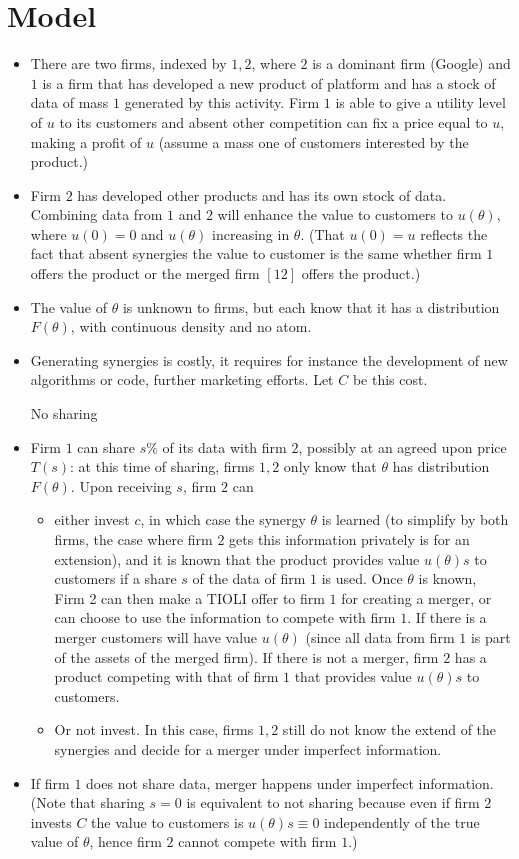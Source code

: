 \documentclass[a4paper,leqno]{article}%
\renewcommand{\t}{\theta}
\begin{document}
\section{Model}
\begin{itemize}
    \item There are two firms, indexed by $1,2$, where $2$ is a dominant firm (Google) and $1$ is a firm that has developed a new product of platform and has a stock of data of mass $1$ generated by this activity. Firm $1$ is able to give a utility level of $u$ to its customers and absent other competition can fix a price equal to $u$, making a profit of $u$ (assume a mass one of customers interested by the product.)
    \item Firm $2$ has developed other products and has its own stock of data. Combining data from $1$ and $2$ will enhance the value to customers to $u(\t)$, where $u(0)=0$ and $u(\t)$ increasing in $\t$. (That $u(0)=u$ reflects the fact that absent synergies the value to customer is the same whether firm $1$ offers the product or the merged firm $[12]$ offers the product.)
    \item The value of $\t$ is unknown to firms, but each know that it has a distribution $F(\t)$, with continuous density and no atom.
    \item Generating synergies is costly, it requires for instance the development of new algorithms or code, further marketing efforts. Let $C$ be this cost.
    \item [No sharing]
    \item Firm $1$ can share $s\%$ of its data with firm $2$, possibly at an agreed upon price $T(s)$: at this time of sharing, firms $1,2$ only know that $\t$ has distribution $F(\t)$. Upon receiving $s$, firm $2$ can 
    \begin{itemize}
        \item either invest $c$, in which case the synergy $\t$ is learned (to simplify by both firms, the case where firm $2$ gets this information privately is for an extension), and it is known that the product provides value $u(\t)s$ to customers if a share $s$ of the data of firm $1$ is used. Once $\t$ is known, Firm 2 can then make a TIOLI offer to firm $1$ for creating a merger, or can choose to use the information to compete with firm $1$. If there is a merger customers will have value $u(\t)$ (since all data from firm $1$ is part of the assets of the merged firm). If there is not a merger, firm $2$ has a product competing with that of firm $1$ that provides value $u(\t)s$ to customers.
        \item Or not invest. In this case, firms $1,2$ still do not know the extend of the synergies and decide for a merger under imperfect information.
    \end{itemize}
    \item If firm $1$ does not share data, merger happens under imperfect information. (Note that sharing $s=0$ is equivalent to not sharing because even if firm $2$ invests $C$ the value to customers is $u(\t)s\equiv 0$ independently of the true value of $\t$, hence firm $2$ cannot compete with firm $1$.)
\end{itemize}
\end{document}

